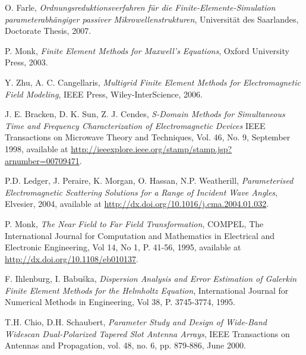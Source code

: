 \begin{thebibliography}{99}
 O. Farle, \emph{Ordnungsreduktionsverfahren f\"{u}r die Finite-Elemente-Simulation parameterabh\"{a}ngiger passiver Mikrowellenstrukturen}, Universit\"{a}t des Saarlandes, Doctorate Thesis, 2007.

 P. Monk, \emph{Finite Element Methods for Maxwell's Equations}, Oxford University Press, 2003.

 Y. Zhu, A. C. Cangellaris, \emph{Multigrid Finite Element Methods for Electromagnetic Field Modeling}, IEEE Press, Wiley-InterScience, 2006.

 J. E. Bracken, D. K. Sun, Z. J. Cendes, \emph{S-Domain Methods for Simultaneous Time and Frequency Characterization of Electromagnetic Devices} IEEE Transactions on Microwave Theory and Techniques, Vol. 46, No. 9, September 1998, available at \url{http://ieeexplore.ieee.org/stamp/stamp.jsp?arnumber=00709471}.

 P.D. Ledger, J. Peraire, K. Morgan, O. Hassan, N.P. Weatherill, \emph{Parameterised Electromagnetic Scattering Solutions for a Range of Incident Wave Angles}, Elvesier, 2004, available at \url{http://dx.doi.org/10.1016/j.cma.2004.01.032}.

 P. Monk, \emph{The Near Field to Far Field Transformation}, COMPEL, The International Journal for Computation and Mathematics in Electrical and Electronic Engineering, Vol 14, No 1, P. 41-56, 1995, available at \url{http://dx.doi.org/10.1108/eb010137}.

 F. Ihlenburg, I. Babu\v{s}ka, \emph{Dispersion Analysis and Error Estimation of Galerkin Finite Element Methods for the Helmholtz Equation}, International Journal for Numerical Methods in Engineering, Vol 38, P. 3745-3774, 1995.

 T.H. Chio, D.H. Schaubert, \emph{Parameter Study and Design of Wide-Band Widescan Dual-Polarized Tapered Slot Antenna Arrays}, IEEE Transactions on Antennas and Propagation, vol. 48, no. 6, pp. 879-886, June 2000.



\end{thebibliography}
